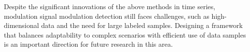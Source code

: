 Despite the significant innovations of the above methods in time series, modulation signal modulation detection still faces challenges, such as high-dimensional data and the need for large labeled samples. Designing a framework that balances adaptability to complex scenarios with efficient use of data samples is an important direction for future research in this area.